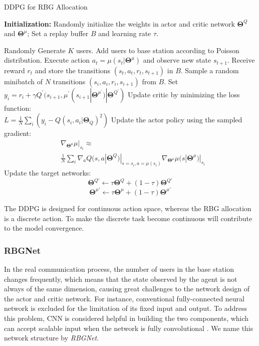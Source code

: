 \documentclass[conference,compsocconf]{IEEEtran}
\begin{document}
\begin{algorithm}
	\caption{DDPG for RBG Allocation}
	\begin{algorithmic}[1]\label{al:1}
		\STATE \textbf{Initialization:} Randomly initialize the weights in actor and critic network $ \mathbf{\Theta}^Q $ and $\mathbf{\Theta}^{\mu}$;  Set a replay buffer $B$ and learning rate $\tau$.
		
		\STATE Randomly Generate $K$ users.
		\STATE Add users to base station according to Poisson distribution.
		\STATE Execute action $ a_{t}=\mu (s_t|\mathbf{\Theta}^{\mu}) $ and observe new state $ s_{t+1} $.
		\STATE Receive reward $ r_{t} $ and store the transitions $ (s_{t}, a_{t}, r_{t}, s_{t+1}) $ in $ B $.
		\STATE Sample a random minibatch of $ N $ transitions $ (s_i, a_i, r_i, s_{i+1}) $ from $ B $.
		\STATE Set $ y_i = r_i + \gamma Q^{\prime}(s_{i+1}, \mu^{\prime}(s_{i+1}|\mathbf{\Theta}^{\mu^{\prime}})|\mathbf{\Theta}^{Q^{\prime}}) $
		\STATE Update critic by minimizing the loss function: \\$ L=\frac{1}{N} \sum_{i}(y_i - Q(s_i, a_i|\mathbf{\Theta}_Q)^2)$
		\STATE Update the actor policy using the sampled gradient:
		$$
		\begin{aligned}
		&\nabla_{\mathbf{\Theta}^{\mu}}\mu|_{s_i}\approx \\ &\frac{1}{N}\sum_i \nabla_{a}Q(s, a|\mathbf{\Theta}^Q)|_{s=s_i,a=\mu(s_i)}\nabla_{\mathbf{\Theta}^{\mu}}\mu(s|\mathbf{\Theta}^{\mu})|_{s_i}
		\end{aligned}
		$$
		\STATE Update the target networks:
		$$
		\mathbf{\Theta}^{Q \prime} \leftarrow \tau\mathbf{\Theta}^{Q} + (1-\tau)\mathbf{\Theta}^{Q \prime}
		$$
		$$
		\mathbf{\Theta}^{\mu \prime} \leftarrow \tau\mathbf{\Theta}^{\mu} + (1-\tau)\mathbf{\Theta}^{\mu \prime}
		$$
		\ENDFOR
		\ENDFOR
	\end{algorithmic}
\end{algorithm}


The DDPG is designed for continuous action space, whereas the RBG allocation is a discrete action. To make the discrete task become continuous will contribute to the model convergence.

\subsubsection{RBGNet}
In the real communication process, the number of users in the base station changes frequently, which means that the state observed by the agent is not always of the same dimension, causing great challenges to the network design of the actor and critic network. For instance, conventional fully-connected neural network is excluded for the limitation of its fixed input and output. To address this problem, CNN is considered helpful in building the two components, which can accept scalable input when the network is fully convolutional \cite{long2015fully}. We name this network structure by \textit{RBGNet}.
\end{document}
